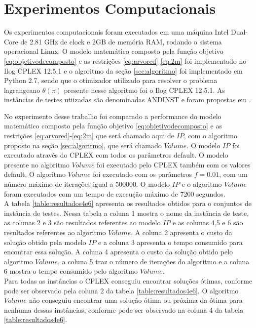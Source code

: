 \section{Experimentos Computacionais}\label{sec:experimentos} 
Os experimentos computacionais foram executados em uma máquina Intel Dual-Core de 2.81 GHz de clock e
2GB de memória RAM, rodando o sistema operacional Linux. O modelo matemático composto pela função objetivo \eqref{eq:objetivodecomposto} e
as restrições \eqref{eq:arvored}-\eqref{eq:2m} foi implementado
no Ilog CPLEX 12.5.1 e o algoritmo da seção \ref{sec:algoritmo} foi implementado
em Python 2.7, sendo que o otimizador utilizado para resolver o problema lagrangeano $\theta (\pi)$ presente nesse algoritmo foi o Ilog CPLEX 12.5.1.
As instâncias de testes utiizadas são denominadas ANDINST e foram propostas em \cite{Andrade06}.

No experimento desse trabalho foi comparado a performance do modelo matemático composto pela função objetivo \eqref{eq:objetivodecomposto} e
as restrições \eqref{eq:arvored}-\eqref{eq:2m} que será 
chamado aqui de $IP$, com o algoritmo proposto na seção \ref{sec:algoritmo}, que será chamado $Volume$.
O modelo $IP$ foi executado através do CPLEX com todos os parâmetros default. O modelo presente no algoritmo $Volume$
foi executado pelo CPLEX também com os valores default. O algoritmo $Volume$ foi executado com os parâmetros 
$f = 0.01$, com um número máximo de iterações igual a 500000. O modelo $IP$ e o algoritmo $Volume$ foram executados com um tempo de execução máximo de 7200 segundos. \\ 

A tabela \ref{table:resultados4e6} apresenta os resultados obtidos para o conjuntos de instância de testes. Nessa tabela a
coluna 1 mostra o nome da instância de teste, as colunas 2 e 3 são resultados referentes ao modelo $IP$ e as colunas
4,5 e 6 são resultados referentes ao algoritmo $Volume$. A coluna 2 apresenta o custo da solução obtido pela
modelo $IP$ e a coluna 3 apresenta o tempo consumido para encontrar essa solução. A coluna 4 apresenta o custo da solução 
obtido pelo algoritmo $Volume$, a coluna 5 traz o número de iterações do algoritmo
e a coluna 6 mostra o tempo consumido pelo algoritmo $Volume$.\\
Para todas as instâncias o CPLEX conseguiu encontrar soluções ótimas, conforme
pode ser observado pela coluna 2 da tabela \ref{table:resultados4e6}. O algoritmo
$Volume$ não conseguiu encontrar uma solução ótima ou próxima da ótima para nenhuma dessas instâncias, conforme
pode ser observado na coluna 4 da tabela \ref{table:resultados4e6}.

